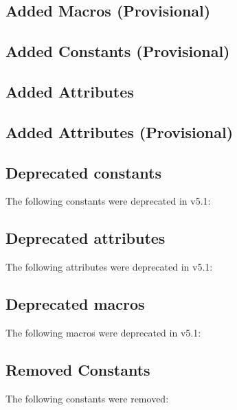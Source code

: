\subsection{Added Macros (Provisional)}


\subsection{Added Constants (Provisional)}


\subsection{Added Attributes}

\subsection{Added Attributes (Provisional)}

\subsection{Deprecated constants}

The following constants were deprecated in v5.1:

\subsection{Deprecated attributes}

The following attributes were deprecated in v5.1:

\subsection{Deprecated macros}

The following macros were deprecated in v5.1:

\subsection{Removed Constants}

The following constants were removed:


